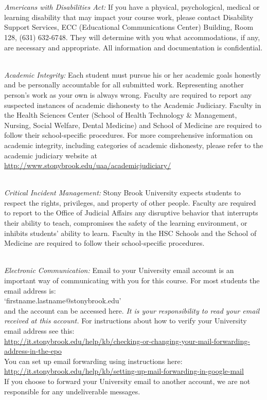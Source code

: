 \documentclass[11pt]{article}
\begin{document}
\ \\[2mm]
 \\

\noindent
{\em Americans with Disabilities Act: }
%
If you have a physical, psychological, medical or learning disability
that may impact your course work, please contact Disability Support
Services, ECC (Educational Communications Center) Building, Room 128,
(631) 632-6748. They will determine with you what accommodations, if
any, are necessary and appropriate. All information and documentation
is confidential.


\ \\[-2mm]
\noindent
{\em Academic Integrity: }
%
Each student must pursue his or her academic goals honestly and be
personally accountable for all submitted work.  Representing another
person's work as your own is always wrong.  Faculty are required to
report any suspected instances of academic dishonesty to the Academic
Judiciary. Faculty in the Health Sciences Center (School of Health
Technology \& Management, Nursing, Social Welfare, Dental Medicine) and
School of Medicine are required to follow their school-specific
procedures. For more comprehensive information on academic integrity,
including categories of academic dishonesty, please refer to the
academic judiciary website at
\url{http://www.stonybrook.edu/uaa/academicjudiciary/}

\ \\[-2mm]
\noindent
{\em Critical Incident Management: }
%
Stony Brook University expects students to respect the rights,
privileges, and property of other people. Faculty are required to
report to the Office of Judicial Affairs any disruptive behavior that
interrupts their ability to teach, compromises the safety of the
learning environment, or inhibits students' ability to learn.  Faculty
in the HSC Schools and the School of Medicine are required to follow
their school-specific procedures.

\ \\[-2mm]
{\em Electronic Communication: }
%
Email to your University email account is an important way of
communicating with you for this course.  For most students the email
address is:\\[0.25em] `firstname.lastname@stonybrook.edu'\\[0.25em]
and the account can be
accessed here.
{\em It is your responsibility to read your email received at this
  account.}
For instructions about how to verify your University email address see
this: \\[0.25em]
\url{http://it.stonybrook.edu/help/kb/checking-or-changing-your-mail-forwarding-address-in-the-epo} \\[0.25em]
%
You can set up email forwarding using instructions here: \\[0.25em]
\url{http://it.stonybrook.edu/help/kb/setting-up-mail-forwarding-in-google-mail}
\\[0.25em]
%
If you choose to forward your University email to another account, we
are not responsible for any undeliverable messages.
\end{document}
